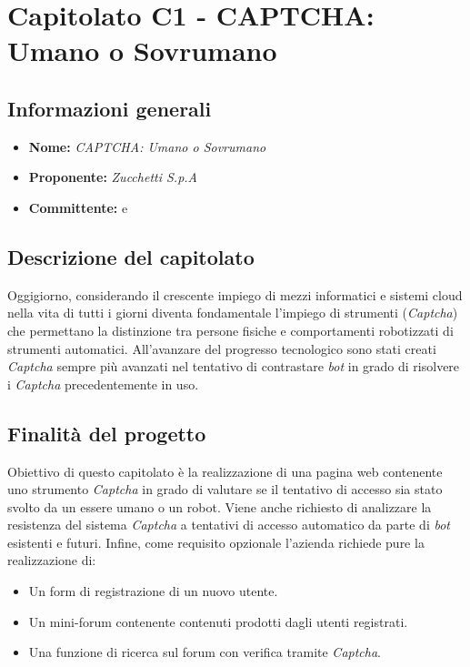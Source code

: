 \section{Capitolato C1 - CAPTCHA: Umano o Sovrumano}\label{section:c1}

\subsection{Informazioni generali}
\begin{itemize}
    \item \textbf{Nome:} \textit{CAPTCHA: Umano o Sovrumano}
    \item \textbf{Proponente:} \textit{Zucchetti S.p.A}
    \item \textbf{Committente:} \commitNameM{} e \commitNameS{}
\end{itemize}

\subsection{Descrizione del capitolato}
Oggigiorno, considerando il crescente impiego di mezzi informatici e sistemi cloud nella vita di tutti i giorni diventa fondamentale l’impiego di strumenti (\textit{Captcha}) che permettano la distinzione tra persone fisiche e comportamenti robotizzati di strumenti automatici.
All'avanzare del progresso tecnologico sono stati creati \textit{Captcha} sempre più avanzati nel
tentativo di contrastare \textit{bot} in grado di risolvere i \textit{Captcha} precedentemente in uso.


\subsection{Finalità del progetto}
Obiettivo di questo capitolato è la realizzazione di una pagina web contenente uno strumento
\textit{Captcha} in grado di valutare se il tentativo di accesso sia stato svolto da un essere umano o un robot.
Viene anche richiesto di analizzare la resistenza del sistema \textit{Captcha} a tentativi di accesso
automatico da parte di \textit{bot} esistenti e futuri.
Infine, come requisito opzionale l’azienda richiede pure la realizzazione di:

\begin{itemize}
    \item Un form di registrazione di un nuovo utente.
    \item Un mini-forum contenente contenuti prodotti dagli utenti registrati.
    \item Una funzione di ricerca sul forum con verifica tramite \textit{Captcha}.
\end{itemize}

